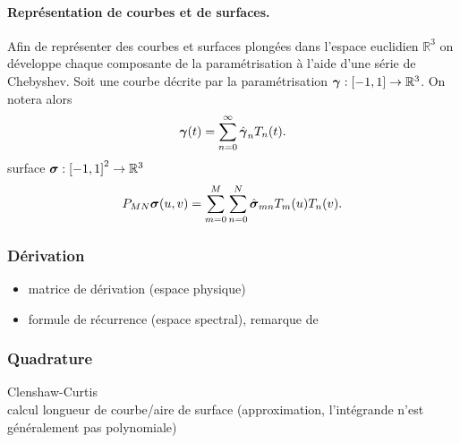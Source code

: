 %

\paragraph{Représentation de courbes et de surfaces.}
Afin de représenter des courbes et surfaces plongées dans l'espace euclidien $\mathbb{R}^3$ on développe chaque composante de la paramétrisation à l'aide d'une série de Chebyshev.
Soit une courbe décrite par la paramétrisation $\boldsymbol{\gamma} : \left[ -1, 1 \right] \to \mathbb{R}^3$. On notera alors
\begin{equation}
	\boldsymbol{\gamma}(t) = \sum_{n=0}^{\infty} \hat{\boldsymbol{\gamma}}_{n} T_n(t).
\end{equation}
surface $\boldsymbol{\sigma} : \left[ -1, 1 \right]^2 \to \mathbb{R}^3$
\begin{equation}
	P_{MN}{\boldsymbol{\sigma}}(u,v) = \sum_{m=0}^{M} \sum_{n=0}^{N} \hat{\boldsymbol{\sigma}}_{mn} T_m(u) T_n(v).
\end{equation}


\subsubsection{Dérivation}
\begin{itemize}
	\item matrice de dérivation (espace physique)
	\item formule de récurrence (espace spectral), remarque de \cite[Section~2.3, p~.94]{wengle1978}%
\end{itemize}

\subsubsection{Quadrature}
Clenshaw-Curtis\\
calcul longueur de courbe/aire de surface (approximation, l'intégrande n'est généralement pas polynomiale)


